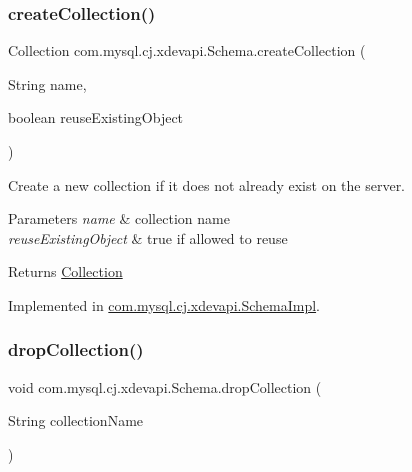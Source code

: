 \subsubsection{\texorpdfstring{create\+Collection()}{createCollection()}\hspace{0.1cm}{\footnotesize\ttfamily [2/2]}}
{\footnotesize\ttfamily Collection com.\+mysql.\+cj.\+xdevapi.\+Schema.\+create\+Collection (\begin{DoxyParamCaption}\item[{String}]{name,  }\item[{boolean}]{reuse\+Existing\+Object }\end{DoxyParamCaption})}

Create a new collection if it does not already exist on the server.


\begin{DoxyParams}{Parameters}
{\em name} & collection name \\
\hline
{\em reuse\+Existing\+Object} & true if allowed to reuse \\
\hline
\end{DoxyParams}
\begin{DoxyReturn}{Returns}
\mbox{\hyperlink{interfacecom_1_1mysql_1_1cj_1_1xdevapi_1_1_collection}{Collection}} 
\end{DoxyReturn}


Implemented in \mbox{\hyperlink{classcom_1_1mysql_1_1cj_1_1xdevapi_1_1_schema_impl_a723a878ef263bfeec2efcf434849da84}{com.\+mysql.\+cj.\+xdevapi.\+Schema\+Impl}}.

\mbox{\label{interfacecom_1_1mysql_1_1cj_1_1xdevapi_1_1_schema_aed2eef7be93416d42ed6b1d6c86bccdd}} 
\subsubsection{\texorpdfstring{drop\+Collection()}{dropCollection()}}
{\footnotesize\ttfamily void com.\+mysql.\+cj.\+xdevapi.\+Schema.\+drop\+Collection (\begin{DoxyParamCaption}\item[{String}]{collection\+Name }\end{DoxyParamCaption})}

